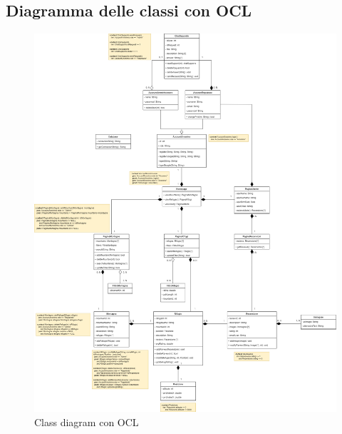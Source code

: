 \documentclass[a4paper,12pt]{article}
\begin{document}
\subsection{Diagramma delle classi con OCL}
\begin{figure}[H]
   \centering
   \includegraphics[width=1.1\textwidth] {D3/img/class_diagram_OCL.png}
    \caption{Class diagram con OCL}
\end{figure}
\end{document}
